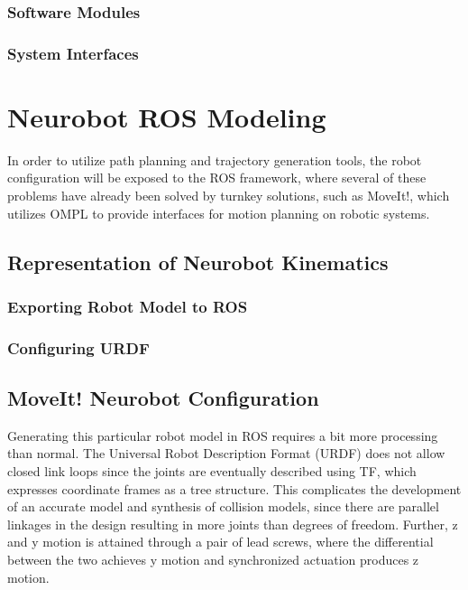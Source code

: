 \documentclass[12pt]{report}
\begin{document}
\subsection{Software Modules}

\subsection{System Interfaces}

\chapter{Neurobot ROS Modeling}
In order to utilize path planning and trajectory generation tools, the robot configuration will be exposed to the ROS framework, where several of these problems have already been solved by turnkey solutions, such as MoveIt!, which utilizes OMPL to provide interfaces for motion planning on robotic systems. \cite{moveIt} 


\section{Representation of Neurobot Kinematics}
\subsection{Exporting Robot Model to ROS}

\subsection{Configuring URDF}


\section{MoveIt! Neurobot Configuration}
Generating this particular robot model in ROS requires a bit more processing than normal. The Universal Robot Description Format (URDF) does not allow closed link loops since the joints are eventually described using TF, which expresses coordinate frames as a tree structure. This complicates the development of an accurate model and synthesis of collision models, since there are parallel linkages in the design resulting in more joints than degrees of freedom. Further, z and y motion is attained through a pair of lead screws, where the differential between the two achieves y motion and synchronized actuation produces z motion. 
\end{document}
